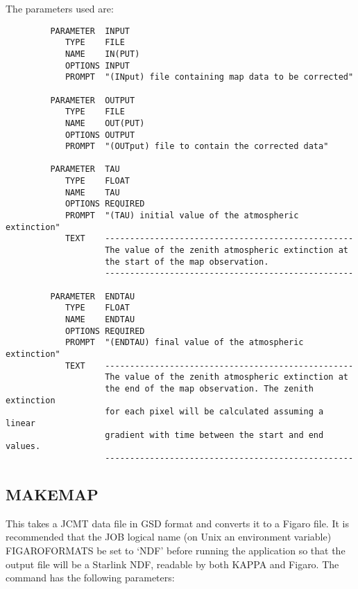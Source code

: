 \documentclass[twoside,11pt]{article}
\newcommand{\xlabel}[1]{}
\renewcommand{\_}{\texttt{\symbol{95}}}
\begin{document}
\goodbreak

The parameters used are:

\begin{small}
\begin{verbatim}
         PARAMETER  INPUT
            TYPE    FILE
            NAME    IN(PUT)
            OPTIONS INPUT
            PROMPT  "(INput) file containing map data to be corrected"

         PARAMETER  OUTPUT
            TYPE    FILE
            NAME    OUT(PUT)
            OPTIONS OUTPUT
            PROMPT  "(OUTput) file to contain the corrected data"

         PARAMETER  TAU
            TYPE    FLOAT
            NAME    TAU
            OPTIONS REQUIRED
            PROMPT  "(TAU) initial value of the atmospheric extinction"
            TEXT    --------------------------------------------------
                    The value of the zenith atmospheric extinction at
                    the start of the map observation.
                    --------------------------------------------------

         PARAMETER  ENDTAU
            TYPE    FLOAT
            NAME    ENDTAU
            OPTIONS REQUIRED
            PROMPT  "(ENDTAU) final value of the atmospheric extinction"
            TEXT    --------------------------------------------------
                    The value of the zenith atmospheric extinction at
                    the end of the map observation. The zenith extinction
                    for each pixel will be calculated assuming a linear 
                    gradient with time between the start and end values.
                    --------------------------------------------------
\end{verbatim}
\end{small}


\goodbreak

\subsection{\xlabel{MAKEMAP}MAKEMAP}

This takes a JCMT data file in GSD format and converts it to a Figaro
file. It is recommended that the JOB logical name (on Unix an
environment variable) FIGARO\_FORMATS be
set  to `NDF' before running the application so that the output file
will be a Starlink NDF, readable by both KAPPA and Figaro. The command
has the following parameters:

\goodbreak
\end{document}
